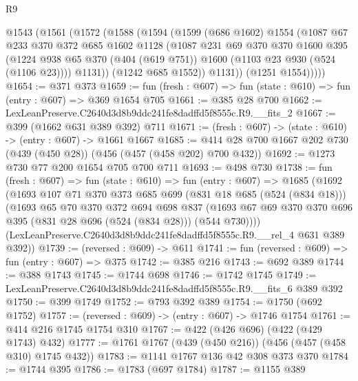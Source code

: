 \begin{lexlean}{R9}
\begin{coremodule}
      @1543
        (@1561
          (@1572
            (@1588
              (@1594
                (@1599
                  (@686 @1602)
                  @1554
                  (@1087
                    @67
                    @233
                    @370
                    @372
                    @685
                    @1602
                    @1128
                    (@1087
                      @231
                      @69
                      @370
                      @370
                      @1600
                      @395
                      (@1224
                        @938
                        @65
                        @370
                        (@404 (@619 @751))
                        @1600
                        (@1103 @23 @930 (@524 (@1106 @23))))
                      @1131))
                  (@1242 @685 @1552))
                @1131))
            (@1251 @1554)))))
@1654 := @371 @373
@1659 := fun (fresh : @607) => fun (state : @610) => fun (entry : @607) => @369 @1654 @705
@1661 := @385 @28 @700
@1662 := LexLeanPreserve.C2640d3d8b9ddc241fe8dadffd5f8555c.R9.__fits_2
@1667 := @399 (@1662 @631 @389 @392) @711
@1671 := (fresh : @607) -> (state : @610) -> (entry : @607) -> @1661 @1667
@1685 := @414 @28 @700 @1667 @202 @730 (@439 (@450 @28)) (@456 (@457 (@458 @202) @700 @432))
@1692 := @1273 @730 @77 @200 @1654 @705 @700 @711
@1693 := @498 @730
@1738 := fun (fresh : @607) =>
  fun (state : @610) =>
  fun (entry : @607) =>
  @1685
    (@1692
      (@1693
        @107
        @71
        @370
        @373
        @685
        @699
        (@831 @18 @685 (@524 (@834 @18)))
        (@1693
          @65
          @70
          @370
          @372
          @694
          @698
          @837
          (@1693 @67 @69 @370 @370 @696 @395 (@831 @28 @696 (@524 (@834 @28))) (@544 @730))))
      (LexLeanPreserve.C2640d3d8b9ddc241fe8dadffd5f8555c.R9.__rel_4 @631 @389 @392))
@1739 := (reversed : @609) -> @611
@1741 := fun (reversed : @609) => fun (entry : @607) => @375
@1742 := @385 @216
@1743 := @692 @389
@1744 := @388 @1743
@1745 := @1744 @698
@1746 := @1742 @1745
@1749 := LexLeanPreserve.C2640d3d8b9ddc241fe8dadffd5f8555c.R9.__fits_6 @389 @392
@1750 := @399 @1749
@1752 := @793 @392 @389
@1754 := @1750 (@692 @1752)
@1757 := (reversed : @609) -> (entry : @607) -> @1746 @1754
@1761 := @414 @216 @1745 @1754 @310
@1767 := @422 (@426 @696) (@422 (@429 @1743) @432)
@1777 := @1761 @1767 (@439 (@450 @216)) (@456 (@457 (@458 @310) @1745 @432))
@1783 := @1141 @1767 @136 @42 @308 @373 @370
@1784 := @1744 @395
@1786 := @1783 (@697 @1784)
@1787 := @1155 @389

\end{coremodule}
\end{lexlean}
